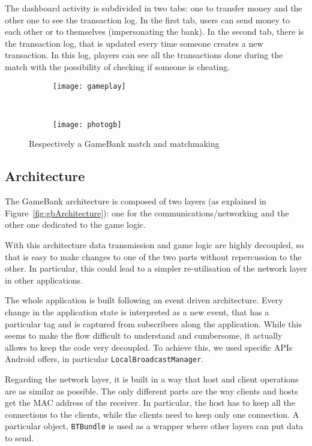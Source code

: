 The dashboard activity is subdivided in two tabs: one to transfer money and 
the other one to see the transaction log. In the first tab, users can send 
money to each other or to themselves (impersonating the bank). In the second 
tab, there is the transaction log, that is updated every time someone creates a 
new transaction. In this log, players can see all the transactions done 
during the match with the possibility of checking if someone is cheating. 

\begin{figure}[t]
    \centering
    
    \begin{subfigure}
        \centering
        \texttt{[image: gameplay]}
        \label{fig:gameplay}
    \end{subfigure}%
    ~ 
    \begin{subfigure}
        \centering
        \texttt{[image: photogb]}
        \label{fig:gamebank}
    \end{subfigure}
    \label{fig:matchmaking}
    \caption{Respectively a GameBank match and matchmaking}
\end{figure}

\subsection{Architecture}

The GameBank architecture is composed of two layers (as 
explained in Figure~\ref{fig:gbArchitecture}): one for the 
communications/networking and the other one dedicated to the game logic. 

With this architecture data transmission and game logic are highly decoupled, so 
that is easy to make changes to one of the two parts without repercussion to 
the other. In particular, this could lead to a simpler re-utilisation of the 
network layer in other applications.

The whole application is built following an event driven architecture. Every 
change in the application state is interpreted as a new event, that has a 
particular tag and is captured from subscribers along the application. While 
this seems to make the flow difficult to understand and cumbersome, it actually 
allows to keep the code very decoupled. To achieve this, we used specific APIs 
Android offers, in particular \texttt{LocalBroadcastManager}.

Regarding the network layer, it is built in a way that host and client 
operations are as similar as possible. The only different parts are the way 
clients and hosts get the MAC address of the receiver. In particular, the host 
has to keep all the connections to the clients, while the clients need to keep  
only one connection. A particular object, \texttt{BTBundle} is used as a wrapper 
where other layers can put data to send.

